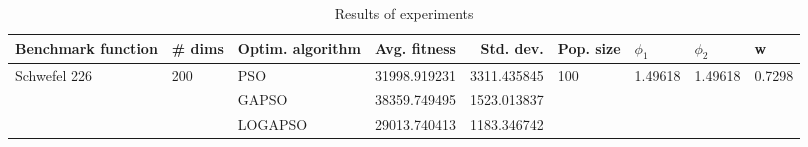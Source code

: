 \begin{table}
\centering
\caption{Results of experiments}
\begin{tabular}{lllrrllll}
\toprule
           Benchmark function &              \# dims & Optim. algorithm &  Avg. fitness &   Std. dev. &            Pop. size &               $\phi_{1}$ &               $\phi_{2}$ &                       w \\
\midrule
\multirow{3}{*}{Schwefel 226} & \multirow{3}{*}{200} &              PSO &  31998.919231 & 3311.435845 & \multirow{3}{*}{100} & \multirow{3}{*}{1.49618} & \multirow{3}{*}{1.49618} & \multirow{3}{*}{0.7298} \\
                              &                      &            GAPSO &  38359.749495 & 1523.013837 &                      &                          &                          &                         \\
                              &                      &          LOGAPSO &  29013.740413 & 1183.346742 &                      &                          &                          &                         \\
\bottomrule
\end{tabular}
\end{table}
